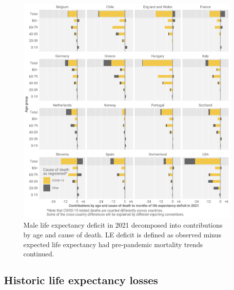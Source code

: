 \documentclass[12pt]{article}
\begin{document}
\begin{figure}[ht!]
    \centering
    \includegraphics{53-e0diffcodM.pdf}
    \caption{Male life expectancy deficit in 2021 decomposed into contributions by age and cause of death. LE deficit is defined as observed minus expected life expectancy had pre-pandemic mortality trends continued.}
    \label{fig:e0diffcodM}
\end{figure}

\clearpage

\subsection*{Historic life expectancy losses}
\end{document}
